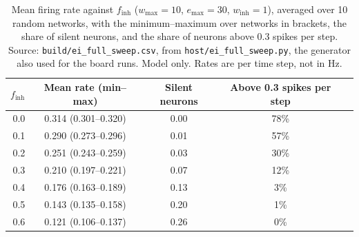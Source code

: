 \documentclass[11pt]{article}
\begin{document}
\begin{table}[t]
\centering
\caption{Mean firing rate against $f_{\mathrm{inh}}$ ($w_{\max}=10$, $e_{\max}=30$, $w_{\mathrm{inh}}=1$), averaged over 10 random networks, with the minimum--maximum over networks in brackets, the share of silent neurons, and the share of neurons above 0.3 spikes per step. Source: \texttt{build/ei\_full\_sweep.csv}, from \texttt{host/ei\_full\_sweep.py}, the generator also used for the board runs. Model only. Rates are per time step, not in Hz.}
\label{tab:ei}
\begin{tabular}{rcccc}
\toprule
$f_{\mathrm{inh}}$ & Mean rate (min--max) & Silent neurons & Above 0.3 spikes per step \\
\midrule
0.0 & 0.314 (0.301--0.320) & 0.00 & 78\% \\
0.1 & 0.290 (0.273--0.296) & 0.01 & 57\% \\
0.2 & 0.251 (0.243--0.259) & 0.03 & 30\% \\
0.3 & 0.210 (0.197--0.221) & 0.07 & 12\% \\
0.4 & 0.176 (0.163--0.189) & 0.13 & 3\% \\
0.5 & 0.143 (0.135--0.158) & 0.20 & 1\% \\
0.6 & 0.121 (0.106--0.137) & 0.26 & 0\% \\
\bottomrule
\end{tabular}
\end{table}
\end{document}

